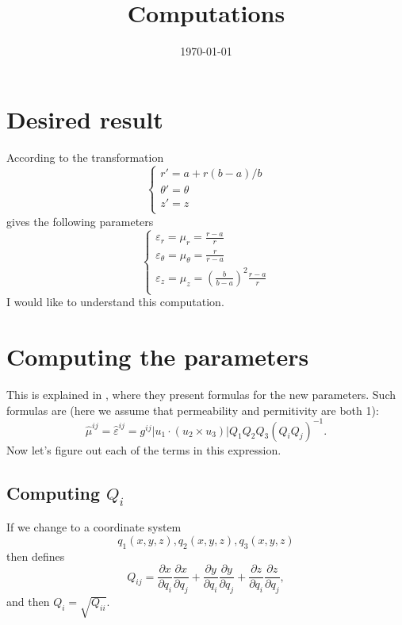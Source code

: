 \documentclass{amsart}
\begin{document}
\newcommand{\R}{\mathbb{R}}
\newcommand\tbf[1]{\textbf{#1}}
\newcommand\myworries[1]{\textcolor{red}{\tbf{#1}}}

\title{Computations}
\date{\today}
\maketitle

\section{Desired result}

According to \cite{smith06} the transformation
\begin{equation}\label{THEtransCyl}
  \begin{cases}
  r'=a+r(b-a)/b\\
  \theta'=\theta\\
  z'=z\\
\end{cases}\end{equation}
gives the following parameters
\begin{equation}\begin{cases}
  \varepsilon_r=\mu_r=\frac{r-a}{r}\\
  \varepsilon_\theta=\mu_\theta=\frac{r}{r-a}\\
  \varepsilon_z=\mu_z=\left(\frac{b}{b-a}\right)^2\frac{r-a}{r}\\
\end{cases}\end{equation}
I would like to understand this computation.
\section{Computing the parameters}
This is explained in \cite{ward96}, where they present formulas for the new parameters.
Such formulas are (here we assume that permeability and permitivity are both 1):
\begin{equation}
  \hat{\mu}^{ij}=\hat{\varepsilon}^{ij}=g^{ij}|u_1\cdot(u_2\times u_3)|Q_1Q_2Q_3(Q_iQ_j)^{-1}.
\end{equation}
Now let's figure out each of the terms in this expression.

\subsection{Computing $Q_i$} If we change to a coordinate system
\[q_1(x,y,z),q_2(x,y,z),q_3(x,y,z)\]
then \cite{ward96} defines
\begin{equation}\label{matrixQ}
  Q_{ij}=\frac{\partial x}{\partial q_i}\frac{\partial x}{\partial q_j}+\frac{\partial y}{\partial q_i}\frac{\partial y}{\partial q_j}+\frac{\partial z}{\partial q_i}\frac{\partial z}{\partial q_j},
\end{equation}
and then $Q_i=\sqrt{Q_{ii}}$.
\end{document}
